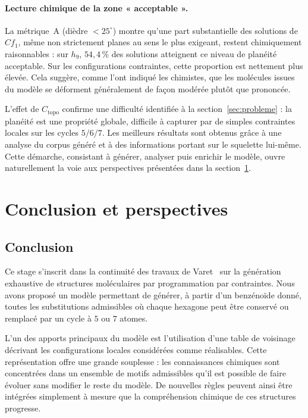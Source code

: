 \documentclass[11pt,a4paper]{article}
\begin{document}
\paragraph{Lecture chimique de la zone « acceptable ».}
La métrique~A (dièdre $< 25^\circ$) montre qu'une part substantielle des
solutions de $Cf_1$, même non strictement planes au sens le plus exigeant,
restent chimiquement raisonnables : sur $h_9$, $54{,}4\,\%$ des solutions
atteignent ce niveau de planéité acceptable. Sur les configurations
contraintes, cette proportion est nettement plus élevée. Cela suggère,
comme l'ont indiqué les chimistes, que les molécules issues du modèle se
déforment généralement de façon modérée plutôt que prononcée.


L'effet de $C_{\text{topo}}$ confirme une difficulté identifiée à la
section~\ref{sec:probleme} : la planéité est une propriété globale, difficile à
capturer par de simples contraintes locales sur les cycles $5/6/7$. Les
meilleurs résultats sont obtenus grâce à une analyse du corpus généré et à des
informations portant sur le squelette lui-même. Cette démarche, consistant à
générer, analyser puis enrichir le modèle, ouvre naturellement la voie aux
perspectives présentées dans la section~\ref{sec:conclusion}.



\section{Conclusion et perspectives}
\label{sec:conclusion}

\subsection{Conclusion}

Ce stage s'inscrit dans la continuité des travaux de Varet~\cite{varet2022}
sur la génération exhaustive de structures moléculaires par programmation par
contraintes. Nous avons proposé un modèle permettant de générer, à partir d'un
benzénoïde donné, toutes les substitutions admissibles où chaque hexagone peut
être conservé ou remplacé par un cycle à $5$ ou $7$ atomes.

L'un des apports principaux du modèle est l'utilisation d'une table de
voisinage décrivant les configurations locales considérées comme réalisables.
Cette représentation offre une grande souplesse : les connaissances chimiques
sont concentrées dans un ensemble de motifs admissibles qu'il est possible de
faire évoluer sans modifier le reste du modèle. De nouvelles règles peuvent
ainsi être intégrées simplement à mesure que la compréhension chimique de ces
structures progresse.
\end{document}
